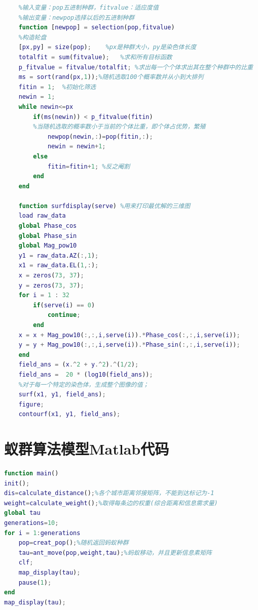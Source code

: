 \documentclass[UTF8,12pt]{ctexart}
\begin{document}
\begin{appendices}
\begin{scriptsize}
\begin{lstlisting}[language=Matlab]
    %如何选择新的个体
    %输入变量：pop五进制种群，fitvalue：适应度值
    %输出变量：newpop选择以后的五进制种群
    function [newpop] = selection(pop,fitvalue)
    %构造轮盘
    [px,py] = size(pop);    %px是种群大小，py是染色体长度
    totalfit = sum(fitvalue);   %求和所有目标函数
    p_fitvalue = fitvalue/totalfit; %求出每一个个体求出其在整个种群中的比重
    ms = sort(rand(px,1));%随机选取100个概率数并从小到大排列
    fitin = 1;  %初始化筛选
    newin = 1;
    while newin<=px
        if(ms(newin)) < p_fitvalue(fitin) 
        %当随机选取的概率数小于当前的个体比重，即个体占优势，繁殖
            newpop(newin,:)=pop(fitin,:); 
            newin = newin+1;
        else
            fitin=fitin+1; %反之阉割
        end
    end
    
    function surfdisplay(serve) %用来打印最优解的三维图
    load raw_data
    global Phase_cos
    global Phase_sin
    global Mag_pow10
    y1 = raw_data.AZ(:,1);
    x1 = raw_data.EL(1,:);
    x = zeros(73, 37);
    y = zeros(73, 37);
    for i = 1 : 32
        if(serve(i) == 0) 
            continue;
        end
    x = x + Mag_pow10(:,:,i,serve(i)).*Phase_cos(:,:,i,serve(i));
    y = y + Mag_pow10(:,:,i,serve(i)).*Phase_sin(:,:,i,serve(i));
    end
    field_ans = (x.^2 + y.^2).^(1/2);
    field_ans =  20 * (log10(field_ans));    
    %对于每一个特定的染色体，生成整个图像的值；
    surf(x1, y1, field_ans);
    figure;
    contourf(x1, y1, field_ans);
\end{lstlisting}
    \end{scriptsize}



    \section{蚁群算法模型Matlab代码}
    \begin{scriptsize}
        \begin{lstlisting}[language=Matlab]
    function main()
init();
dis=calculate_distance();%各个城市距离邻接矩阵，不能到达标记为-1
weight=calculate_weight();%取得每条边的权重(综合距离和信息需求量)
global tau
generations=10;
for i = 1:generations
    pop=creat_pop();%随机返回蚂蚁种群
    tau=ant_move(pop,weight,tau);%蚂蚁移动，并且更新信息素矩阵
    clf;
    map_display(tau);
    pause(1);
end
map_display(tau);
    

\end{lstlisting}
\end{scriptsize}
\end{appendices}
\end{document}
